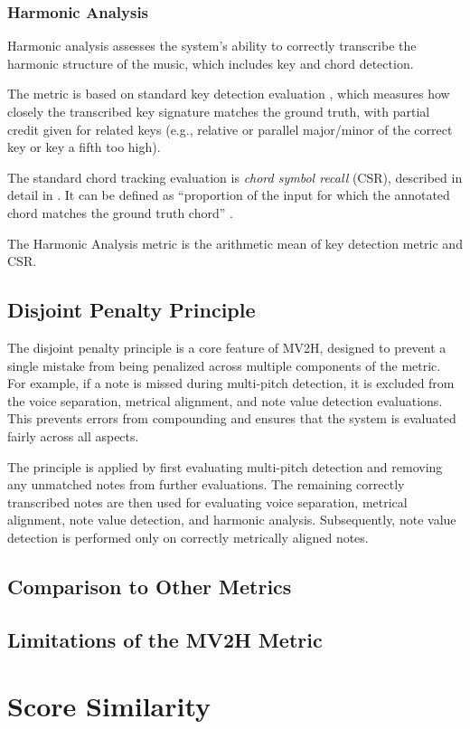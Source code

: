 \subsubsection{Harmonic Analysis}

Harmonic analysis assesses the system’s ability to correctly transcribe the harmonic structure of the music, which includes key and chord detection. 

The metric is based on standard key detection evaluation \cite{Raffel2014}, which measures how closely the transcribed key signature matches the ground truth, with partial credit given for related keys (e.g., relative or parallel major/minor of the correct key or key a fifth too high).

The standard chord tracking evaluation is \emph{chord symbol recall} (CSR), described in detail in \cite{Harte2010}. It can be defined as ``proportion of the input for which the annotated chord matches the ground truth chord'' \cite{McLeod2018}.

The Harmonic Analysis metric is the arithmetic mean of key detection metric and CSR.

\subsection{Disjoint Penalty Principle}

The disjoint penalty principle is a core feature of MV2H, designed to prevent a single mistake from being penalized across multiple components of the metric. For example, if a note is missed during multi-pitch detection, it is excluded from the voice separation, metrical alignment, and note value detection evaluations. This prevents errors from compounding and ensures that the system is evaluated fairly across all aspects.

The principle is applied by first evaluating multi-pitch detection and removing any unmatched notes from further evaluations. The remaining correctly transcribed notes are then used for evaluating voice separation, metrical alignment, note value detection, and harmonic analysis. Subsequently, note value detection is performed only on correctly metrically aligned notes.

\subsection{Comparison to Other Metrics}

\missing

\subsection{Limitations of the MV2H Metric}

\missing

\section{Score Similarity}

\missing

\cite{Cogliati2017}
